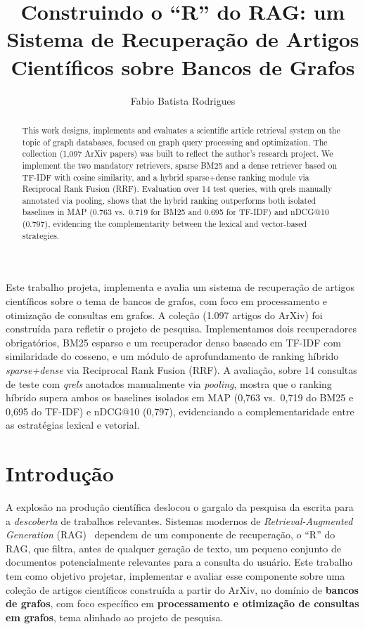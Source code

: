 \documentclass[12pt]{article}
\title{Construindo o ``R'' do RAG: um Sistema de Recuperação de
Artigos Científicos sobre Bancos de Grafos}
\author{Fabio Batista Rodrigues\inst{1}}
\begin{document}
\maketitle

\begin{abstract}
This work designs, implements and evaluates a scientific article retrieval
system on the topic of graph databases, focused on graph query processing
and optimization. The collection (1,097 ArXiv papers) was built to reflect
the author's research project. We implement the two mandatory
retrievers, sparse BM25 and a dense retriever based on TF-IDF with
cosine similarity, and a hybrid sparse+dense ranking module via
Reciprocal Rank Fusion (RRF). Evaluation over 14 test queries, with qrels
manually annotated via pooling, shows that the hybrid ranking outperforms
both isolated baselines in MAP (0.763 vs.\ 0.719 for BM25 and 0.695 for
TF-IDF) and nDCG@10 (0.797), evidencing the complementarity between the
lexical and vector-based strategies.
\end{abstract}

\begin{resumo}
Este trabalho projeta, implementa e avalia um sistema de recuperação de
artigos científicos sobre o tema de bancos de grafos, com foco em
processamento e otimização de consultas em grafos. A coleção (1.097
artigos do ArXiv) foi construída para refletir o projeto de pesquisa. 
Implementamos dois recuperadores obrigatórios, BM25 esparso e um
recuperador denso baseado em TF-IDF com similaridade do cosseno, e um
módulo de aprofundamento de ranking híbrido \textit{sparse+dense} via
Reciprocal Rank Fusion (RRF). A avaliação, sobre 14 consultas de teste com
\textit{qrels} anotados manualmente via \textit{pooling}, mostra que o
ranking híbrido supera ambos os baselines isolados em MAP (0,763 vs.\
0,719 do BM25 e 0,695 do TF-IDF) e nDCG@10 (0,797), evidenciando a
complementaridade entre as estratégias lexical e vetorial.
\end{resumo}

\section{Introdução}

A explosão na produção científica deslocou o gargalo da pesquisa da escrita
para a \textit{descoberta} de trabalhos relevantes. Sistemas modernos de
\textit{Retrieval-Augmented Generation} (RAG)~\cite{lewis2020rag} dependem de
um componente de recuperação, o ``R'' do RAG, que filtra, antes de
qualquer geração de texto, um pequeno conjunto de documentos potencialmente
relevantes para a consulta do usuário. Este trabalho tem como objetivo
projetar, implementar e avaliar esse componente sobre uma coleção de artigos
científicos construída a partir do ArXiv, no domínio de \textbf{bancos de
grafos}, com foco específico em \textbf{processamento e otimização de
consultas em grafos}, tema alinhado ao projeto de pesquisa.
\end{document}
